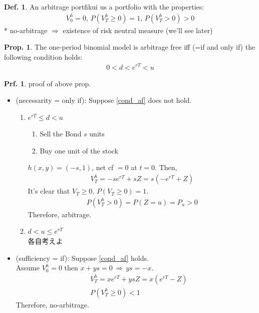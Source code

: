\documentclass[a4paper,11pt]{jsarticle}
\theoremstyle{definition}
\newtheorem{definition}{Def.}[subsection]
\newtheorem{prf}{Prf.}[subsection]
\newtheorem{prop}{Prop.}[subsection]
\begin{document}
\begin{definition}
  An arbitrage portfikui us a portfolio with the properties:
  \begin{align}
    V_0^h=0, \, P(V_T^h\geq 0)=1, \, P(V_T^h>0)>0
  \end{align}
  * no-arbitrage $\Rightarrow$ existence of risk neutral measure
  (we'll see later)
\end{definition}

\begin{prop}\label{prop_af}
  The one-period binomial model is arbitrage free
  iff (=if and only if) the following condition holds:
  \begin{align}\label{cond_af}
    0 < d < e^{rT} <u
  \end{align}

  \begin{prf}{proof of above prop.} 
    
    \begin{itemize}
      \item (necessarity = only if):
      Suppose \ref{cond_af} does not hold.
      \begin{enumerate}
        \item $e^{rT}\leq d < u$
        \begin{enumerate}
          \item Sell the Bond $s$ units
          \item Buy one unit of the stock
        \end{enumerate}
        $h(x,y)=(-s,1)$, net cf $=0$ at $t=0$.
        Then,
        \begin{align}
          V_T^h=-se^{rT}+sZ=s(-e^{rT}+Z)
        \end{align}
        It's clear that $V_T \geq 0$, $P(V_T\geq 0)=1$.
        \begin{align}
          P(V_T^h>0)=P(Z=u)=P_u>0
        \end{align}
        Therefore, arbitrage.

        \item $d < u \leq e^{rT}$ \\
        各自考えよ
      \end{enumerate}

      \item (sufficiency = if):
      Suppose \ref{cond_af} holds. \\
      Assume $V_0^h=0$ then $x+ys=0 \, \Rightarrow \, ys=-x$.
      \begin{align}
        &V_T^h =xe^{rT}+ysZ=x(e^{rT}-Z) \\
        &P(V_T^h\geq 0) < 1
      \end{align}
      Therefore, no-arbitrage.

    \end{itemize}
  \end{prf}

\end{prop}
\end{document}
